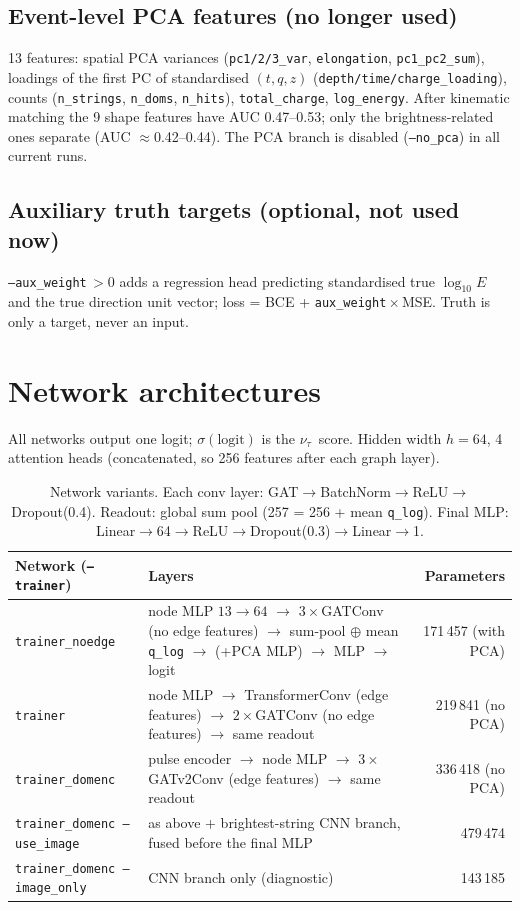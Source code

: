 \documentclass[11pt,a4paper]{article}
\newcommand{\nutau}{\ensuremath{\nu_\tau}}
\newcommand{\code}[1]{\texttt{#1}}
\begin{document}
\subsection{Event-level PCA features (no longer used)}
13 features: spatial PCA variances (\code{pc1/2/3\_var}, \code{elongation}, \code{pc1\_pc2\_sum}), loadings of the
first PC of standardised $(t,q,z)$ (\code{depth/time/charge\_loading}), counts (\code{n\_strings}, \code{n\_doms},
\code{n\_hits}), \code{total\_charge}, \code{log\_energy}. After kinematic matching the 9 shape features have
AUC 0.47--0.53; only the brightness-related ones separate (AUC $\approx$0.42--0.44). The PCA branch is disabled
(\code{--no\_pca}) in all current runs.

\subsection{Auxiliary truth targets (optional, not used now)}
\code{--aux\_weight}\,$>0$ adds a regression head predicting standardised true $\log_{10}E$ and the true direction unit
vector; loss = BCE + \code{aux\_weight}\,$\times$\,MSE. Truth is only a target, never an input.

\section{Network architectures}
All networks output one logit; $\sigma(\text{logit})$ is the \nutau\ score. Hidden width $h=64$, 4 attention heads
(concatenated, so 256 features after each graph layer).

\begin{table}[h]
\centering\small
\begin{tabularx}{\textwidth}{lYr}
\toprule
Network (\code{--trainer}) & Layers & Parameters\\
\midrule
\code{trainer\_noedge} & node MLP $13\to64$ $\to$ $3\times$GATConv (no edge features) $\to$ sum-pool $\oplus$ mean \code{q\_log} $\to$ (+PCA MLP) $\to$ MLP $\to$ logit & 171\,457 (with PCA)\\
\code{trainer} & node MLP $\to$ TransformerConv (edge features) $\to$ $2\times$GATConv (no edge features) $\to$ same readout & 219\,841 (no PCA)\\
\code{trainer\_domenc} & pulse encoder $\to$ node MLP $\to$ $3\times$GATv2Conv (edge features) $\to$ same readout & 336\,418 (no PCA)\\
\code{trainer\_domenc --use\_image} & as above + brightest-string CNN branch, fused before the final MLP & 479\,474\\
\code{trainer\_domenc --image\_only} & CNN branch only (diagnostic) & 143\,185\\
\bottomrule
\end{tabularx}
\caption{Network variants. Each conv layer: GAT$\to$BatchNorm$\to$ReLU$\to$Dropout(0.4). Readout: global sum pool
(257 = 256 + mean \code{q\_log}). Final MLP: Linear$\to$64$\to$ReLU$\to$Dropout(0.3)$\to$Linear$\to$1.}
\end{table}
\end{document}
